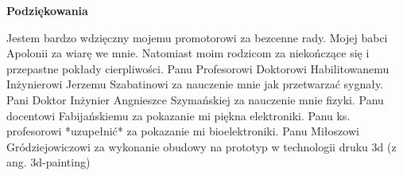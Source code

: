 \newpage
    \begin{center}
	{\large\bfseries Podziękowania}\par\bigskip\end{center}
Jestem bardzo wdzięczny	mojemu promotorowi za bezcenne rady.
Mojej babci Apolonii za wiarę we mnie.
Natomiast moim rodzicom za niekończące się i przepastne pokłady cierpliwości.
Panu Profesorowi Doktorowi Habilitowanemu Inżynierowi Jerzemu Szabatinowi za nauczenie mnie jak przetwarzać sygnały.
Pani Doktor Inżynier Angnieszce Szymańskiej za nauczenie mnie fizyki.
Panu docentowi Fabijańskiemu za pokazanie mi piękna elektroniki.
Panu ks. profesorowi *uzupełnić* za pokazanie mi bioelektroniki.
Panu Miłoszowi Gródziejowiczowi za wykonanie obudowy na prototyp w technologii druku 3d (z ang. 3d-painting)

